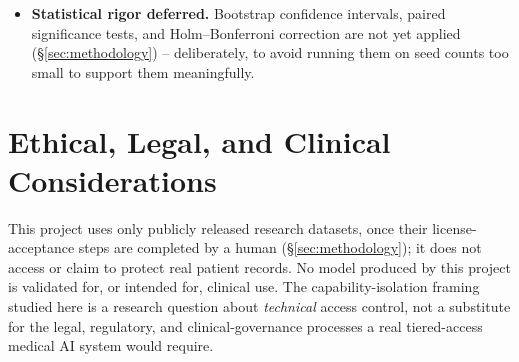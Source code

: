 \documentclass[11pt]{article}
\begin{document}
\begin{itemize}[nosep]
list): property inference and the A4 integrity attacks
(\S\ref{sec:integrity}: label-flipping, sign-flipping, model-replacement,
backdoor, free-rider, malformed-update, and token-replay -- the last via
\texttt{medgate/crypto/authorization.py}'s TTL/expiry support, tested in
\texttt{tests/test\_phase3\_integrity\_and\_property.py}); genuine
parameter-space low-rank adapter completion and its two-attacker collusion
variant (\S\ref{sec:adapter-recovery}, rebuilt in this repair pass after a
validity bug invalidated the earlier version -- see P0-A in the
repair-pass-4 audit); disjoint SVM/decision-tree probes alongside the
original four (\S\ref{sec:ablation}); and a fair pretrained-baseline
family replacing the single unfair frozen-backbone baseline
(\S\ref{sec:results-hierarchical}).
\textbf{Attacks still not implemented}, listed exactly, not glossed over:
client attribution, full fine-tuning recovery under a fixed compute budget
distinct from the few-shot probe already implemented, known-adapter
comparison, and the stronger gradient-inversion variants iDLG/Geiping et
al. (both now \texttt{VERIFIED} citations, \S\ref{sec:related}, but not yet
implemented as additional attacks alongside the simplified DLG in
\S\ref{sec:security}).
\item \textbf{Statistical rigor deferred.} Bootstrap confidence intervals,
paired significance tests, and Holm--Bonferroni correction are not yet
applied (\S\ref{sec:methodology}) -- deliberately, to avoid running them on
seed counts too small to support them meaningfully.
\end{itemize}

\section{Ethical, Legal, and Clinical Considerations}
This project uses only publicly released research datasets, once their
license-acceptance steps are completed by a human
(\S\ref{sec:methodology}); it does not access or claim to protect real
patient records. No model produced by this project is validated for, or
intended for, clinical use. The capability-isolation framing studied here
is a research question about \emph{technical} access control, not a
substitute for the legal, regulatory, and clinical-governance processes a
real tiered-access medical AI system would require.
\end{document}
